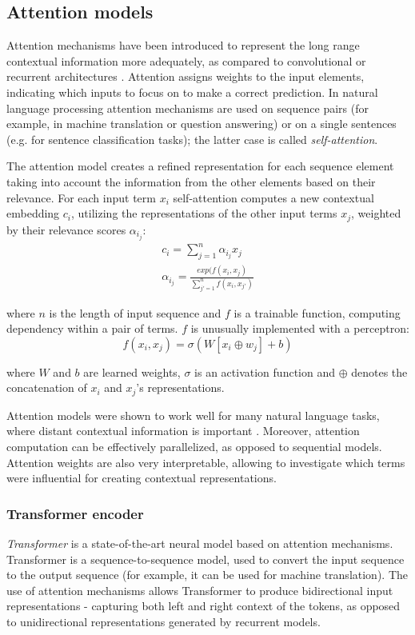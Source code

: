 \subsection{Attention models}

Attention mechanisms have been introduced to represent the long range contextual information more adequately, as compared to convolutional or recurrent architectures \cite{bahdanau2014neural}. Attention assigns weights to the input elements, indicating which inputs to focus on to make a correct prediction. In natural language processing attention mechanisms are used on sequence pairs (for example, in machine translation or question answering) or on a single sentences (e.g. for sentence classification tasks); the latter case is called \textit{self-attention}.

The attention model creates a refined representation for each sequence element taking into account the information from the other elements based on their relevance. For each input term $x_i$ self-attention computes a new contextual embedding $c_i$, utilizing the representations of the other input terms $x_j$, weighted by their relevance scores $\alpha_i_j$:
\begin{gather*}
    c_i = \sum_{j=1}^n \alpha_i_j x_j \\
    \alpha_i_j = \frac{exp(f(x_i, x_j)}{\sum_{j'=1}^n f(x_i, x_{j'})}
\end{gather*}

where $n$ is the length of input sequence and $f$ is a trainable function, computing dependency within a pair of terms. $f$ is unusually implemented with a perceptron:
\begin{equation}
    f(x_i, x_j) = \sigma (W[x_i \oplus  w_j] + b)
\end{equation}

where $W$ and $b$ are learned weights, $\sigma$ is an activation function and $\oplus$ denotes the concatenation of $x_i$ and $x_j$'s representations.

Attention models were shown to work well for many natural language tasks, where distant contextual information is important \cite{bahdanau2014neural, yin2016abcnn}. Moreover, attention computation can be effectively parallelized, as opposed to sequential models. Attention weights are also very interpretable, allowing to investigate which terms were influential for creating contextual representations.

\subsubsection{Transformer encoder}
\textit{Transformer} \cite{vaswani2017attention} is a state-of-the-art neural model based on attention mechanisms. Transformer is a sequence-to-sequence model, used to convert the input sequence to the output sequence (for example, it can be used for machine translation). The use of attention mechanisms allows Transformer to produce bidirectional input representations - capturing both left and right context of the tokens, as opposed to unidirectional representations generated by recurrent models.

